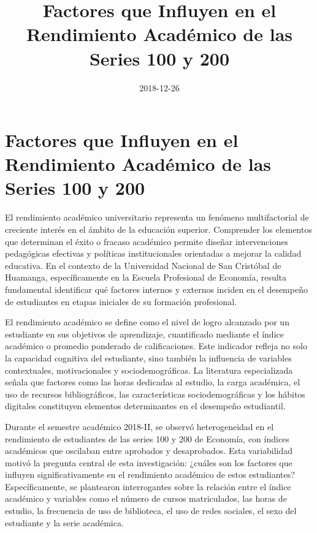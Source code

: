 \documentclass[
  stu,
  floatsintext,
  longtable,
  a4paper,
  nolmodern,
  notxfonts,
  notimes,
  12pt,
  colorlinks=true,linkcolor=blue,citecolor=blue,urlcolor=blue]{apa7}
\title{Factores que Influyen en el Rendimiento Académico de las Series
100 y 200}
\date{2018-12-26}
\begin{document}
\maketitle


\hypertarget{toc}{}
\tableofcontents
\newpage
\section[Introduction]{Factores que Influyen en el Rendimiento Académico
de las Series 100 y 200}

\setcounter{secnumdepth}{3}

\setlength\LTleft{0pt}




El rendimiento académico universitario representa un fenómeno
multifactorial de creciente interés en el ámbito de la educación
superior. Comprender los elementos que determinan el éxito o fracaso
académico permite diseñar intervenciones pedagógicas efectivas y
políticas institucionales orientadas a mejorar la calidad educativa. En
el contexto de la Universidad Nacional de San Cristóbal de Huamanga,
específicamente en la Escuela Profesional de Economía, resulta
fundamental identificar qué factores internos y externos inciden en el
desempeño de estudiantes en etapas iniciales de su formación
profesional.

El rendimiento académico se define como el nivel de logro alcanzado por
un estudiante en sus objetivos de aprendizaje, cuantificado mediante el
índice académico o promedio ponderado de calificaciones. Este indicador
refleja no solo la capacidad cognitiva del estudiante, sino también la
influencia de variables contextuales, motivacionales y
sociodemográficas. La literatura especializada señala que factores como
las horas dedicadas al estudio, la carga académica, el uso de recursos
bibliográficos, las características sociodemográficas y los hábitos
digitales constituyen elementos determinantes en el desempeño
estudiantil.

Durante el semestre académico 2018-II, se observó heterogeneidad en el
rendimiento de estudiantes de las series 100 y 200 de Economía, con
índices académicos que oscilaban entre aprobados y desaprobados. Esta
variabilidad motivó la pregunta central de esta investigación: ¿cuáles
son los factores que influyen significativamente en el rendimiento
académico de estos estudiantes? Específicamente, se plantearon
interrogantes sobre la relación entre el índice académico y variables
como el número de cursos matriculados, las horas de estudio, la
frecuencia de uso de biblioteca, el uso de redes sociales, el sexo del
estudiante y la serie académica.
\end{document}
